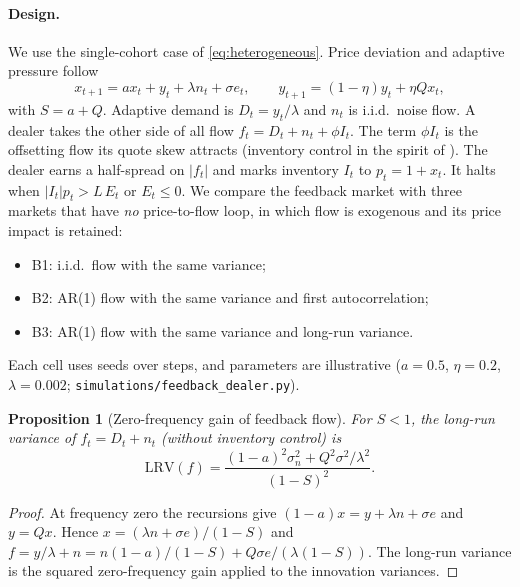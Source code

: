 \documentclass[10pt,twocolumn,letterpaper]{article}
\newtheorem{proposition}[theorem]{Proposition}
\theoremstyle{definition}
\theoremstyle{remark}
\begin{document}
\paragraph{Design.} We use the single-cohort case of \eqref{eq:heterogeneous}. Price deviation and adaptive pressure follow
\[
x_{t+1}=ax_t+y_t+\lambda n_t+\sigma e_t,\qquad y_{t+1}=(1-\eta)y_t+\eta Qx_t,
\]
with $S=a+Q$. Adaptive demand is $D_t=y_t/\lambda$ and $n_t$ is i.i.d.\ noise flow. A dealer takes the other side of all flow $f_t=D_t+n_t+\phi I_t$. The term $\phi I_t$ is the offsetting flow its quote skew attracts (inventory control in the spirit of \citealp{avellaneda2008}). The dealer earns a half-spread on $|f_t|$ and marks inventory $I_t$ to $p_t=1+x_t$. It halts when $|I_t|p_t>L\,E_t$ or $E_t\le0$. We compare the feedback market with three markets that have \emph{no} price-to-flow loop, in which flow is exogenous and its price impact is retained:
\begin{itemize}
 \item B1: i.i.d.\ flow with the same variance;
 \item B2: AR(1) flow with the same variance and first autocorrelation;
 \item B3: AR(1) flow with the same variance and long-run variance.
\end{itemize}
Each cell uses \SolvSeeds{} seeds over \SolvT{} steps, and parameters are illustrative ($a=0.5$, $\eta=0.2$, $\lambda=0.002$; \texttt{simulations/feedback\_dealer.py}).

\begin{proposition}[Zero-frequency gain of feedback flow]
\label{prop:flow_gain}
For $S<1$, the long-run variance of $f_t=D_t+n_t$ (without inventory control) is
\[
\mathrm{LRV}(f)=\frac{(1-a)^2\sigma_n^2+Q^2\sigma^2/\lambda^2}{(1-S)^2}.
\]
\end{proposition}
\begin{proof}
At frequency zero the recursions give $(1-a)x=y+\lambda n+\sigma e$ and $y=Qx$. Hence $x=(\lambda n+\sigma e)/(1-S)$ and $f=y/\lambda+n=n(1-a)/(1-S)+Q\sigma e/(\lambda(1-S))$. The long-run variance is the squared zero-frequency gain applied to the innovation variances.
\end{proof}

\begin{table}[htbp]\centering\scriptsize
\caption{Dealer halt rates (exact 95\% binomial intervals) in the feedback market and in three no-loop benchmarks matched on variance (B1), variance and first autocorrelation (B2), or variance and long-run variance (B3). LRV is computed from \cref{prop:flow_gain}. Simulator law only; not calibrated to any market.}
\label{tab:solvency_phase_diagram}

\end{table}
\end{document}
